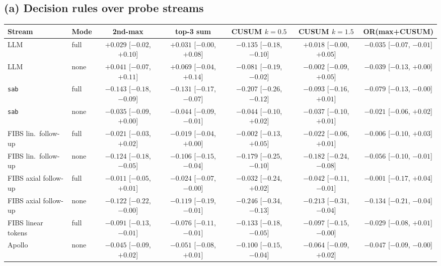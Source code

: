 \documentclass[11pt]{article}
\begin{document}
\subsection{(a) Decision rules over probe streams}

\begin{table}[!htbp]\centering\small
\begin{adjustbox}{max width=\linewidth}\begin{tabular}{@{}llccccc@{}}
\toprule
Stream & Mode & 2nd-max & top-3 sum & CUSUM $k{=}0.5$ & CUSUM $k{=}1.5$ & OR(max+CUSUM)\\
\midrule
LLM & full & $+0.029$ [$-0.02$, $+0.10$] & $+0.031$ [$-0.00$, $+0.08$] & $-0.135$ [$-0.18$, $-0.10$] & $+0.018$ [$-0.00$, $+0.05$] & $-0.035$ [$-0.07$, $-0.01$]\\
LLM & none & $+0.041$ [$-0.07$, $+0.11$] & $+0.069$ [$-0.04$, $+0.14$] & $-0.081$ [$-0.19$, $-0.02$] & $-0.002$ [$-0.09$, $+0.05$] & $-0.039$ [$-0.13$, $+0.00$]\\
\texttt{sab} & full & $-0.143$ [$-0.18$, $-0.09$] & $-0.131$ [$-0.17$, $-0.07$] & $-0.207$ [$-0.26$, $-0.12$] & $-0.093$ [$-0.16$, $+0.01$] & $-0.079$ [$-0.13$, $-0.00$]\\
\texttt{sab} & none & $-0.035$ [$-0.09$, $+0.00$] & $-0.044$ [$-0.09$, $-0.01$] & $-0.044$ [$-0.10$, $+0.02$] & $-0.037$ [$-0.10$, $+0.01$] & $-0.021$ [$-0.06$, $+0.02$]\\
FIBS lin.\ follow-up & full & $-0.021$ [$-0.03$, $+0.02$] & $-0.019$ [$-0.04$, $+0.00$] & $-0.002$ [$-0.13$, $+0.05$] & $-0.022$ [$-0.06$, $+0.01$] & $-0.006$ [$-0.10$, $+0.03$]\\
FIBS lin.\ follow-up & none & $-0.124$ [$-0.18$, $-0.05$] & $-0.106$ [$-0.15$, $-0.04$] & $-0.179$ [$-0.25$, $-0.10$] & $-0.182$ [$-0.24$, $-0.08$] & $-0.056$ [$-0.10$, $-0.01$]\\
FIBS axial follow-up & full & $-0.011$ [$-0.05$, $+0.01$] & $-0.024$ [$-0.07$, $-0.00$] & $-0.032$ [$-0.24$, $+0.02$] & $-0.042$ [$-0.11$, $-0.01$] & $-0.001$ [$-0.17$, $+0.04$]\\
FIBS axial follow-up & none & $-0.122$ [$-0.22$, $-0.00$] & $-0.119$ [$-0.19$, $-0.01$] & $-0.246$ [$-0.34$, $-0.13$] & $-0.213$ [$-0.31$, $-0.04$] & $-0.134$ [$-0.21$, $-0.04$]\\
FIBS linear tokens & full & $-0.091$ [$-0.13$, $-0.01$] & $-0.076$ [$-0.11$, $-0.01$] & $-0.133$ [$-0.18$, $-0.05$] & $-0.097$ [$-0.15$, $-0.00$] & $-0.029$ [$-0.08$, $+0.01$]\\
Apollo & none & $-0.045$ [$-0.09$, $+0.02$] & $-0.051$ [$-0.08$, $+0.01$] & $-0.100$ [$-0.15$, $-0.04$] & $-0.064$ [$-0.09$, $+0.02$] & $-0.047$ [$-0.09$, $-0.00$]\\

\end{tabular}
\end{adjustbox}
\end{table}
\end{document}
